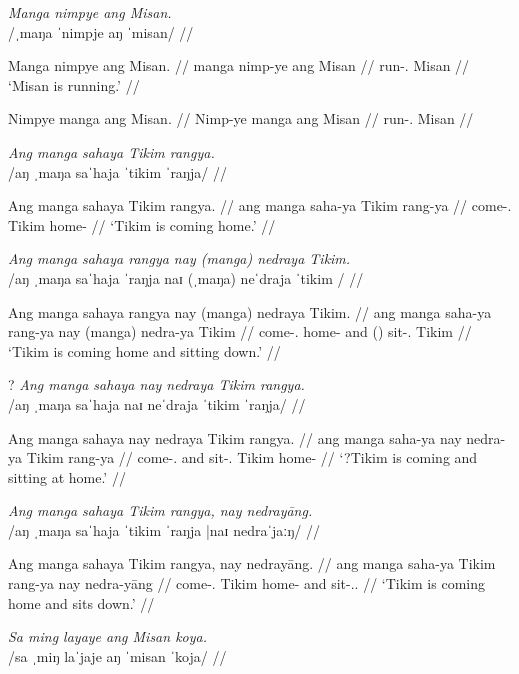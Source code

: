\documentclass[12pt,a4paper]{scrartcl}
\newcommand{\TsgM}{{\Tsg}.{\M}}
\newcommand{\TsgF}{{\Tsg}.{\F}}
\begin{document}
\pex
\a\begingl
\glpreamble \textit{Manga nimpye ang Misan.} \\
	/ˌmaŋa ˈnimpje aŋ ˈmisan/ //

\gla Manga nimpye ang Misan. //
\glb manga nimp-ye ang Misan //
\glc \Prog{} run-\TsgF{} \Aarg{} Misan //
\glft `Misan is running.' //
\endgl

\a\ljudge*\begingl
\gla Nimpye manga ang Misan. //
\glb Nimp-ye manga ang Misan //
\glc run-\TsgF{} \Prog{} \Aarg{} Misan //
\endgl
\xe

\ex\begingl
\glpreamble \textit{Ang manga sahaya Tikim rangya.} \\
	/aŋ ˌmaŋa saˈhaja ˈtikim ˈraŋja/ //

\gla Ang manga sahaya Tikim rangya. //
\glb ang manga saha-ya Tikim rang-ya //
\glc \AgtT{} \Prog{} come-\TsgM{} Tikim home-\Loc{} //
\glft `Tikim is coming home.' //
\endgl\xe

\pex
\a\begingl
\glpreamble \textit{Ang manga sahaya rangya nay (manga) nedraya Tikim.} \\
	/aŋ ˌmaŋa saˈhaja ˈraŋja naɪ (ˌmaŋa) neˈdraja ˈtikim / //

\gla Ang manga sahaya rangya nay (manga) nedraya Tikim. //
\glb ang manga saha-ya rang-ya nay (manga) nedra-ya Tikim //
\glc \AgtT{} \Prog{} come-\TsgM{} home-\Loc{} and (\Prog{}) sit-\TsgM{} Tikim //
\glft `Tikim is coming home and sitting down.' //
\endgl

\a\ljudge?\begingl
\glpreamble \textit{Ang manga sahaya nay nedraya Tikim rangya.} \\
	/aŋ ˌmaŋa saˈhaja naɪ neˈdraja ˈtikim ˈraŋja/ //

\gla Ang manga sahaya nay nedraya Tikim rangya. //
\glb ang manga saha-ya nay nedra-ya Tikim rang-ya //
\glc \AgtT{} \Prog{} come-\TsgM{} and sit-\TsgM{} Tikim home-\Loc{} //
\glft `\judge?Tikim is coming and sitting at home.' //
\endgl
\xe

\ex\begingl
\glpreamble \textit{Ang manga sahaya Tikim rangya, nay nedrayāng.} \\
	/aŋ ˌmaŋa saˈhaja ˈtikim ˈraŋja |naɪ nedraˈjaːŋ/ //

\gla Ang manga sahaya Tikim rangya, nay nedrayāng. //
\glb ang manga saha-ya Tikim rang-ya nay nedra-yāng //
\glc \AgtT{} \Prog{} come-\TsgM{} Tikim home-\Loc{} and sit-\TsgM{}.\Aarg{} //
\glft `Tikim is coming home and sits down.' //
\endgl\xe

\ex\begingl
\glpreamble \textit{Sa ming layaye ang Misan koya.} \\
	/sa ˌmiŋ laˈjaje aŋ ˈmisan ˈkoja/ //
\end{document}
